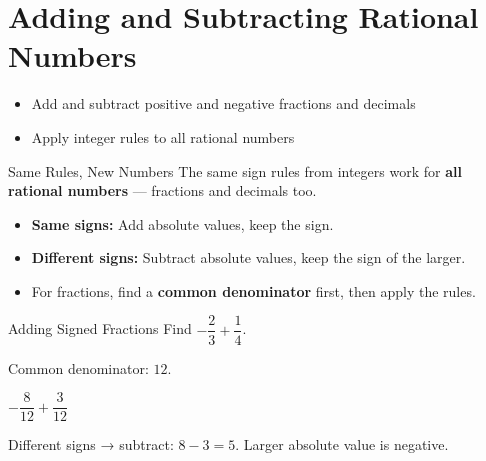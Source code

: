 \section{Adding and Subtracting Rational Numbers}

\begin{learningGoals}
\begin{itemize}
    \item Add and subtract positive and negative fractions and decimals
    \item Apply integer rules to all rational numbers
\end{itemize}
\end{learningGoals}

\begin{conceptBox}{Same Rules, New Numbers}
The same sign rules from integers work for \textbf{all rational numbers} — fractions and decimals too.
\begin{itemize}[leftmargin=*]
    \item \textbf{Same signs:} Add absolute values, keep the sign.
    \item \textbf{Different signs:} Subtract absolute values, keep the sign of the larger.
    \item For fractions, find a \textbf{common denominator} first, then apply the rules.
\end{itemize}
\end{conceptBox}

\begin{workedExample}{Adding Signed Fractions}
Find $-\dfrac{2}{3} + \dfrac{1}{4}$.

Common denominator: $12$.

$-\dfrac{8}{12} + \dfrac{3}{12}$

Different signs → subtract: $8 - 3 = 5$. Larger absolute value is negative.

\end{workedExample}


